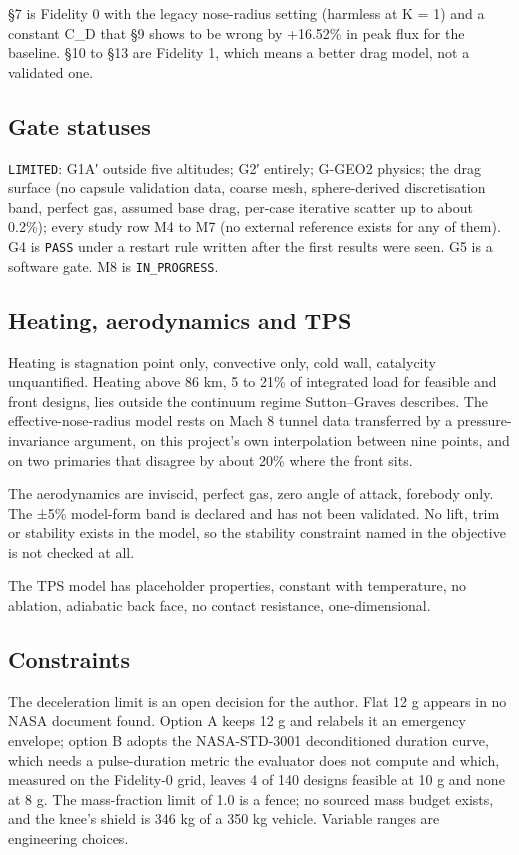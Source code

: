 \documentclass[
  a4paper,
  11pt]{article}
\begin{document}
§7 is Fidelity 0 with the legacy nose-radius setting (harmless at K = 1)
and a constant C\_D that §9 shows to be wrong by +16.52\% in peak flux
for the baseline. §10 to §13 are Fidelity 1, which means a better drag
model, not a validated one.

\subsection{Gate statuses}

\texttt{LIMITED}: G1A{\symfont ′} outside five altitudes; G2{\symfont ′}
entirely; G-GEO2 physics; the drag surface (no capsule validation data,
coarse mesh, sphere-derived discretisation band, perfect gas, assumed
base drag, per-case iterative scatter up to about 0.2\%); every study
row M4 to M7 (no external reference exists for any of them). G4 is
\texttt{PASS} under a restart rule written after the first results were
seen. G5 is a software gate. M8 is \texttt{IN\_\allowbreak{}PROGRESS}.

\subsection{Heating, aerodynamics and TPS}

Heating is stagnation point only, convective only, cold wall, catalycity
unquantified. Heating above 86 km, 5 to 21\% of integrated load for
feasible and front designs, lies outside the continuum regime
Sutton--Graves describes. The effective-nose-radius model rests on Mach
8 tunnel data transferred by a pressure-invariance argument, on this
project's own interpolation between nine points, and on two primaries
that disagree by about 20\% where the front sits.

The aerodynamics are inviscid, perfect gas, zero angle of attack,
forebody only. The ±5\% model-form band is declared and has not been
validated. No lift, trim or stability exists in the model, so the
stability constraint named in the objective is not checked at all.

The TPS model has placeholder properties, constant with temperature, no
ablation, adiabatic back face, no contact resistance, one-dimensional.

\subsection{Constraints}

The deceleration limit is an open decision for the author. Flat 12 g
appears in no NASA document found. Option A keeps 12 g and relabels it
an emergency envelope; option B adopts the NASA-STD-3001 deconditioned
duration curve, which needs a pulse-duration metric the evaluator does
not compute and which, measured on the Fidelity-0 grid, leaves 4 of 140
designs feasible at 10 g and none at 8 g. The mass-fraction limit of 1.0
is a fence; no sourced mass budget exists, and the knee's shield is 346
kg of a 350 kg vehicle. Variable ranges are engineering choices.
\end{document}
